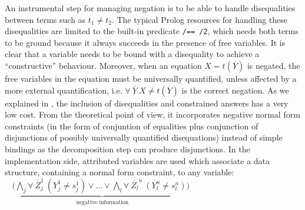 \documentclass{llncs}
\begin{document}
An instrumental step for managing negation is to be able to handle
disequalities between terms such as $t_1 \neq t_2$.  The typical
Prolog resources for handling these disequalities are limited to the
built-in predicate {\tt /== /2}, which needs both terms to be ground
because it always succeeds in the presence of free variables.  It is
clear that a variable needs to be bound with a disequality to achieve
a ``constructive'' behaviour.  Moreover, when an equation $X =
t(\overline{Y})$ is negated, the free variables in the equation must
be universally quantified, unless affected by a more external
quantification, i.e. $\forall~ \overline{Y}~X \neq t(\overline{Y})$ is
the correct negation.  As we explained in \cite{SusanaPADL2000}, the
inclusion of disequalities and constrained answers has a very low
cost. From the theoretical point of view, it incorporates negative normal form 
constraints (in the form of conjuntion of equalities plus conjunction of 
disjunctions of possibly universally quantified
disequations) instead of simple bindings as the decomposition step can produce 
disjunctions. In the implementation side, attributed variables are used 
which associate a data structure, containing a
normal form constraint, to any variable: $~~~~( \underbrace{\bigwedge_j \forall~ \overline{Z}_j^1~(Y_j^1 \neq s_j^1) 
\vee \ldots \vee \bigwedge_l \forall~ \overline{Z_l}^n~(Y_l^n \neq s_l^n) ) }_{\mbox{negative information}} $




\end{document}
